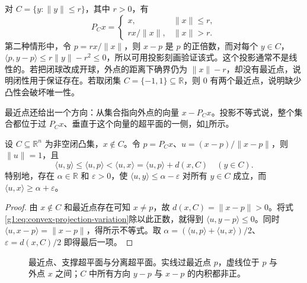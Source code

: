 \begin{example}\label{g1:exm:ball-projection}
	对 \(C=\{y:\lVert y\rVert\leq r\}\)，其中 \(r>0\)，有
	\[
		P_Cx=\begin{cases}x,&\lVert x\rVert\leq r,\\[2pt]
		r x/\lVert x\rVert,&\lVert x\rVert>r.
		\end{cases}
	\]
	第二种情形中，令 \(p=rx/\lVert x\rVert\)，则 \(x-p\) 是 \(p\) 的正倍数，而对每个 \(y\in C\)，\(\langle p,y-p\rangle\leq r\lVert y\rVert-r^2\leq0\)，所以可用投影刻画验证该式。这个投影通常不是线性的。若把闭球改成开球，外点的距离下确界仍为 \(\lVert x\rVert-r\)，却没有最近点，说明闭性用于保证存在。若取闭集 \(C=\{-1,1\}\subseteq\mathbb R\)，则 \(0\) 有两个最近点，说明缺少凸性会破坏唯一性。
\end{example}

最近点还给出一个方向：从集合指向外点的向量 \(x-P_Cx\)。投影不等式说，整个集合都位于过 \(P_Cx\)、垂直于这个向量的超平面的一侧，如\cref{g1:fig:convex-separation}所示。

\begin{theorem}\label{g1:thm:point-closed-separation}
	设 \(C\subseteq\mathbb R^n\) 为非空闭凸集，\(x\notin C\)。令 \(p=P_Cx\)、\(u=(x-p)/\lVert x-p\rVert\)，则 \(\lVert u\rVert=1\)，且
	\begin{equation}\label{g1:eq:point-closed-separation}
		\langle u,y\rangle\leq\langle u,p\rangle
		<\langle u,x\rangle=\langle u,p\rangle+d(x,C)
		\quad(y\in C).
	\end{equation}
	特别地，存在 \(\alpha\in\mathbb R\) 和 \(\varepsilon>0\)，使 \(\langle u,y\rangle\leq\alpha-\varepsilon\) 对所有 \(y\in C\) 成立，而 \(\langle u,x\rangle\geq\alpha+\varepsilon\)。
\end{theorem}
\begin{proof}
	由 \(x\notin C\) 和最近点存在可知 \(x\ne p\)，故 \(d(x,C)=\lVert x-p\rVert>0\)。将式\eqref{g1:eq:convex-projection-variation}除以此正数，就得到 \(\langle u,y-p\rangle\leq0\)。同时 \(\langle u,x-p\rangle=\lVert x-p\rVert\)，得所示不等式。取 \(\alpha=(\langle u,p\rangle+\langle u,x\rangle)/2\)、\(\varepsilon=d(x,C)/2\) 即得最后一项。
\end{proof}

\begin{figure}[htbp]
	\centering
	
	\caption[最近点、支撑超平面与分离超平面]{最近点、支撑超平面与分离超平面。实线过最近点 \(p\)，虚线位于 \(p\) 与外点 \(x\) 之间；\(C\) 中所有方向 \(y-p\) 与 \(x-p\) 的内积都非正。}
	\label{g1:fig:convex-separation}
\end{figure}

